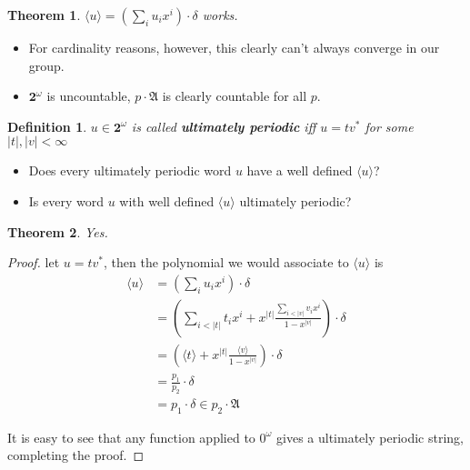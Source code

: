 \documentclass{beamer}
\newtheorem{thm}{Theorem}
\newtheorem{defn}{Definition}
\newcommand{\2}{\textbf{2}}
\newcommand{\p}{\mathfrak{A}}
\begin{document}
\begin{frame}
  \begin{thm}
    $\langle u \rangle = (\sum_i u_i x^i) \cdot \delta$ works.
  \end{thm}

  \begin{itemize}
    \item For cardinality reasons, however, this clearly 
          can't always converge in our group.
    \item $\2^\omega$ is uncountable, $p \cdot \p$ is clearly countable
          for all $p$.
  \end{itemize}
\end{frame}

\begin{frame}
  \begin{defn}
    $u \in \2^\omega$ is called \textbf{ultimately periodic} iff $u = tv^*$
    for some $|t|, |v| < \infty$
  \end{defn}

\begin{itemize}
  \item Does every ultimately periodic word $u$ have a well defined $\langle u \rangle$?
  \item Is every word $u$ with well defined $\langle u \rangle$ ultimately periodic?
\end{itemize}

  \begin{thm}
    Yes.
  \end{thm}
\end{frame}

\begin{frame}
  \begin{proof}
    let $u = tv^*$, then the polynomial we would associate to 
    $\langle u \rangle$ is 
    \begin{align*}
      \langle u \rangle &= (\sum_i u_i x^i) \cdot \delta\\
                        &= \left ( \sum_{i<|t|} t_i x^i + x^{|t|} \frac{\sum_{i<|v|} v_i x^i}{1 - x^{|v|}} \right ) \cdot \delta\\
                        &= \left ( \langle t \rangle + x^{|t|} \frac{\langle v \rangle}{1 - x^{|v|}} \right ) \cdot \delta\\
                        &= \frac{p_1}{p_2} \cdot \delta\\
                        &= p_1 \cdot \delta \in p_2 \cdot \p
    \end{align*}

    It is easy to see that any function applied to $0^\omega$ gives a ultimately periodic string,
    completing the proof.
  \end{proof}
\end{frame}
\end{document}
